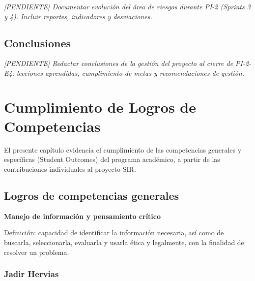 \documentclass[12pt,a4paper,oneside]{report}
\newcommand{\pendiente}[1]{\textit{[PENDIENTE] #1}}
\begin{document}
\pendiente{Documentar evolución del área de riesgos durante PI-2 (Sprints 3 y 4). Incluir reportes, indicadores y desviaciones.}

\section{Conclusiones}\label{sec:conclusiones-3}

\pendiente{Redactar conclusiones de la gestión del proyecto al cierre de PI-2-E4: lecciones aprendidas, cumplimiento de metas y recomendaciones de gestión.}

\chapter{Cumplimiento de Logros de Competencias}\label{cap:8-cumplimiento-de-logros-de-competencias}

El presente capítulo evidencia el cumplimiento de las competencias generales y específicas (Student Outcomes) del programa académico, a partir de las contribuciones individuales al proyecto SIR.

\section{Logros de competencias generales}\label{sec:logros-de-competencias-generales}

\textbf{Manejo de información y pensamiento crítico}

Definición: capacidad de identificar la información necesaria, así como de buscarla, seleccionarla, evaluarla y usarla ética y legalmente, con la finalidad de resolver un problema.

\subsection{Jadir Hervias}\label{subsec:jadir-hervias}
\end{document}
